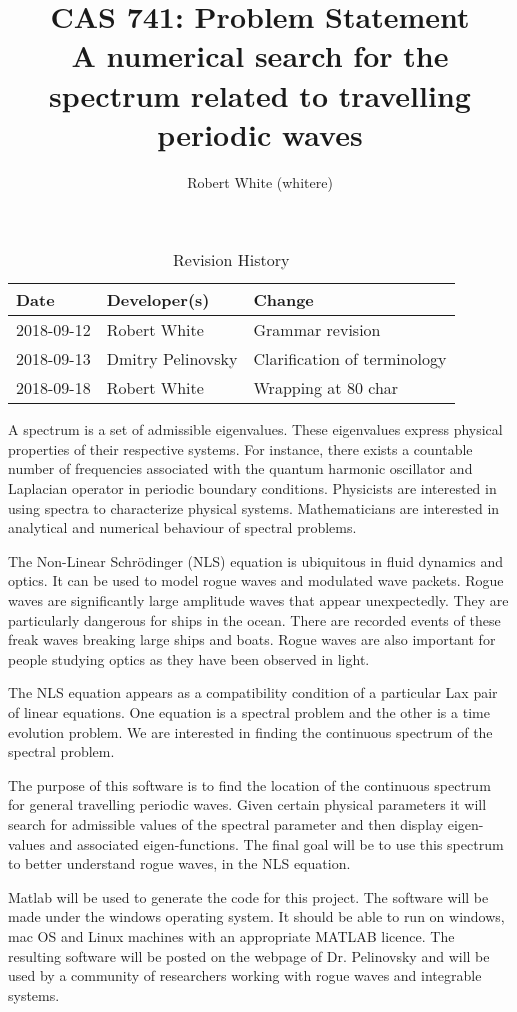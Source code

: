\documentclass{article}
\title{CAS 741: Problem Statement\\A numerical search for the spectrum related
to travelling periodic waves}
\author{Robert White (whitere)}
\date{}
\begin{document}
\maketitle
\begin{table}[hp]
\caption{Revision History} \label{TblRevisionHistory}
\begin{tabularx}{\textwidth}{llX}
\toprule
\textbf{Date} & \textbf{Developer(s)} & \textbf{Change}\\
\midrule
2018-09-12 & Robert White & Grammar revision \\
2018-09-13 & Dmitry Pelinovsky & Clarification of terminology\\ 
2018-09-18 & Robert White & Wrapping at 80 char \\ 
\bottomrule
\end{tabularx}
\end{table}

A spectrum is a set of admissible eigenvalues. These eigenvalues express
physical properties of their respective systems. For instance, there exists a
countable number of frequencies associated with the quantum harmonic oscillator
and Laplacian operator in periodic boundary conditions. Physicists are
interested in using spectra to characterize physical systems. Mathematicians 
are interested in analytical and numerical behaviour of spectral problems.

The Non-Linear Schr\"{o}dinger (NLS) equation is ubiquitous in fluid dynamics 
and optics. It can be used to model rogue waves and modulated wave packets. 
Rogue waves are significantly large amplitude waves that appear unexpectedly. 
They are particularly dangerous for ships in the ocean. There are recorded 
events of these freak waves breaking large ships and boats. Rogue waves are 
also important for people studying optics as they have been observed in light. 

The NLS equation appears as a compatibility condition of a particular Lax pair
of linear equations. One equation is a spectral problem and the other is a time
evolution problem. We are interested in finding the continuous spectrum of the
spectral problem.

The purpose of this software is to find the location of the continuous spectrum
for general travelling periodic waves. Given certain physical parameters it 
will search for admissible values of the spectral parameter and then display
eigen-values and associated eigen-functions. The final goal will be to use this
spectrum to better understand rogue waves, in the NLS equation.

Matlab will be used to generate the code for this project. The software will be
made under the windows operating system. It should be able to run on windows,
mac OS and Linux machines with an appropriate MATLAB licence. The resulting
software will be posted on the webpage of Dr. Pelinovsky and will be used by a
community of researchers working with rogue waves and integrable systems. 


\end{document}
